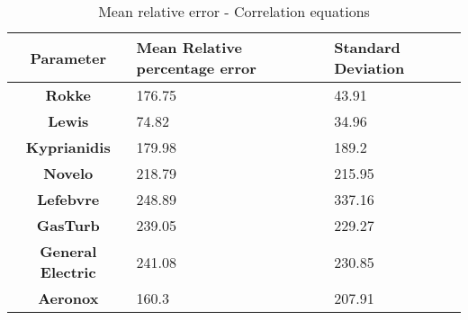 \begin{table}[h!]
  \centering
  \begin{tabularx}{\textwidth}{||c|X|X||}
  \hline
    \cellcolor{gray!20}\textbf{Parameter} & \cellcolor{gray!20}\textbf{Mean Relative percentage error} & \cellcolor{gray!20}\textbf{Standard Deviation} \\ [0.5ex]
  \hline\hline
\centering
    \cellcolor{gray!20}\textbf{Rokke} & 176.75 & 43.91 \\
  \hline
    \cellcolor{gray!20}\textbf{Lewis} & 74.82 & 34.96 \\
  \hline
    \cellcolor{gray!20}\textbf{Kyprianidis} & 179.98 & 189.2 \\
  \hline
    \cellcolor{gray!20}\textbf{Novelo} & 218.79 & 215.95 \\
  \hline
    \cellcolor{gray!20}\textbf{Lefebvre} & 248.89 & 337.16 \\
  \hline
    \cellcolor{gray!20}\textbf{GasTurb} & 239.05 & 229.27 \\
  \hline
    \cellcolor{gray!20}\textbf{General Electric} & 241.08 & 230.85 \\
  \hline
    \cellcolor{gray!20}\textbf{Aeronox} & 160.3 & 207.91 \\
  \hline
  \end{tabularx}
  \caption{Mean relative error - Correlation equations}
  \label{meanEC}
\end{table}
